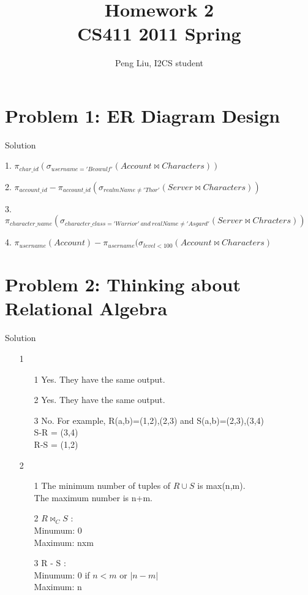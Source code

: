 \documentclass[letter,11pt]{article}
\author{Peng Liu, I2CS student}
\title{Homework 2\\CS411 2011 Spring}
\begin{document}
\lstset{language=SQL}
\maketitle

\section*{Problem 1: ER Diagram Design}Solution

1. $\pi_{char\_id}(\sigma_{username='Beowulf'}(Account\bowtie Characters))$

2. $\pi_{account\_id}-\pi_{account\_id}(\sigma_{realmName\neq'Thor'}(Server\bowtie Characters))$

3. $\pi_{character\_name}(\sigma_{character\_class='Warrior'\ and\ realName\neq'Asgard'}(Server\bowtie Chracters))$

4. $\pi_{username}(Account)-\pi_{username}(\sigma_{level<100}(Account\bowtie Characters)$

\section*{Problem 2: Thinking about Relational Algebra}Solution

\begin{enumerate}
\item[1]
  \begin{enumerate}
  \item[1] Yes. They have the same output.
  \item[2] Yes. They have the same output.
  \item[3] No. For example, R(a,b)={(1,2),(2,3)} and S(a,b)={(2,3),(3,4)}\\
        S-R = {(3,4)}\\
        R-S = {(1,2)}
  \end{enumerate}

\item[2]
  \begin{enumerate}
  \item[1] The minimum number of tuples of $R\cup S$ is max(n,m).\\
    The maximum number is n+m.
  \item[2] $R\bowtie_C S$ :\\
    Minumum: 0\\
    Maximum: nxm
  \item[3] R - S :\\
    Minumum: 0 if $n<m$ or $|n-m|$\\
    Maximum: n
  \end{enumerate}
\end{enumerate}
\end{document}
